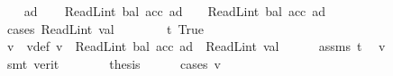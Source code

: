 \begin{isabellebody}
%
\isadelimproof
%
\endisadelimproof
%
\isatagproof
{}\isamarkupfalse%
\isanewline
\ \ \isamarkupfalse%
\ ad{\isacharprime}{\kern0pt}\isanewline
\ \ \isamarkupfalse%
\ {\isachardoublequoteopen}ReadL\isactrlsub i\isactrlsub n\isactrlsub t\ {\isacharparenleft}{\kern0pt}bal\ {\isacharparenleft}{\kern0pt}acc{\isacharprime}{\kern0pt}\ ad{\isacharprime}{\kern0pt}{\isacharparenright}{\kern0pt}{\isacharparenright}{\kern0pt}\ {\isasymge}\ {}\ {\isasymand}\ ReadL\isactrlsub i\isactrlsub n\isactrlsub t\ {\isacharparenleft}{\kern0pt}bal\ {\isacharparenleft}{\kern0pt}acc{\isacharprime}{\kern0pt}\ ad{\isacharprime}{\kern0pt}{\isacharparenright}{\kern0pt}{\isacharparenright}{\kern0pt}\ {\isacharless}{\kern0pt}\ {}\ {\isacharcircum}{\kern0pt}\ {}{}{}{\isachardoublequoteclose}\isanewline
\ \ \isamarkupfalse%
\ {\isacharparenleft}{\kern0pt}cases\ {\isachardoublequoteopen}ReadL\isactrlsub i\isactrlsub n\isactrlsub t\ val\ {\isasymge}\ {}{\isachardoublequoteclose}{\isacharparenright}{\kern0pt}\isanewline
\ \ \ \ \isamarkupfalse%
\ t{}{\isacharcolon}{\kern0pt}\ True\isanewline
\ \ \ \ \isamarkupfalse%
\ v\ \ v{\isacharunderscore}{\kern0pt}def{\isacharcolon}{\kern0pt}\ {\isachardoublequoteopen}v\ {\isacharequal}{\kern0pt}\ ReadL\isactrlsub i\isactrlsub n\isactrlsub t\ {\isacharparenleft}{\kern0pt}bal\ {\isacharparenleft}{\kern0pt}acc\ ad{\isacharparenright}{\kern0pt}{\isacharparenright}{\kern0pt}\ {\isacharminus}{\kern0pt}\ ReadL\isactrlsub i\isactrlsub n\isactrlsub t\ val{\isachardoublequoteclose}\isanewline
\ \ \ \ \isamarkupfalse%
\ assms{\isacharparenleft}{\kern0pt}{}{\isacharparenright}{\kern0pt}\ t{}\ \isamarkupfalse%
\ {\isachardoublequoteopen}v\ {\isacharless}{\kern0pt}\ {}\ {\isacharcircum}{\kern0pt}\ {}{}{}{\isachardoublequoteclose}\ \isamarkupfalse%
\ {\isacharparenleft}{\kern0pt}smt\ {\isacharparenleft}{\kern0pt}verit{\isacharparenright}{\kern0pt}{\isacharparenright}{\kern0pt}\isanewline
\ \ \ \ \isamarkupfalse%
\ \isamarkupfalse%
\ {\isacharquery}{\kern0pt}thesis\isanewline
\ \ \ \ \isamarkupfalse%
\ {\isacharparenleft}{\kern0pt}cases\ {\isachardoublequoteopen}v\ {\isasymge}\ {}{\isachardoublequoteclose}{\isacharparenright}{\kern0pt}\isanewline
\ \ \ \ \ \ \isamarkupfalse%

\end{isabellebody}
